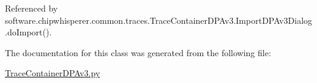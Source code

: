 Referenced by software.\+chipwhisperer.\+common.\+traces.\+Trace\+Container\+D\+P\+Av3.\+Import\+D\+P\+Av3\+Dialog.\+do\+Import().



The documentation for this class was generated from the following file\+:\begin{DoxyCompactItemize}
\item 
\hyperlink{TraceContainerDPAv3_8py}{Trace\+Container\+D\+P\+Av3.\+py}\end{DoxyCompactItemize}
